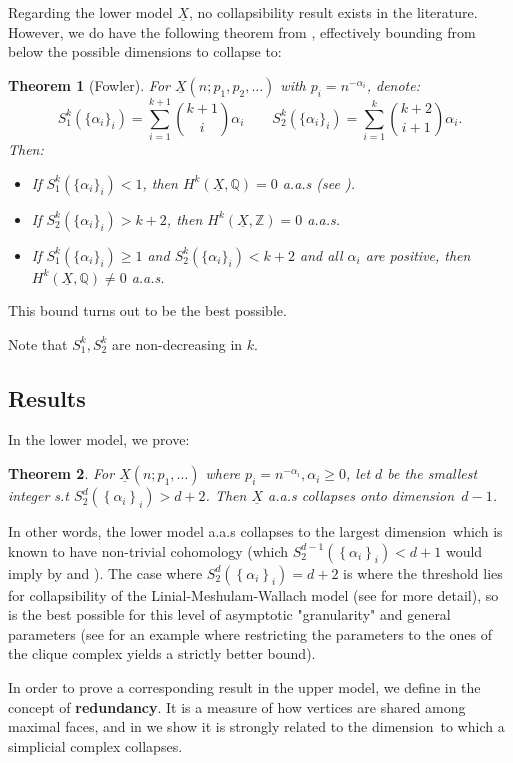\documentclass{article}
\newcommand{\crb}[1]{\left\{ #1 \right\}}
\theoremstyle{plain}
\newtheorem{theorem}{Theorem}[section]
\theoremstyle{definition}
\theoremstyle{remark}
\newcommand{\Z}{\mathbb{Z}}
\newcommand{\Q}{\mathbb{Q}}
\newcommand{\di}{dimension}
\begin{document}
Regarding the lower model $\underline{X}$, no collapsibility result exists in the literature. However, we do have the following theorem from \cite{Fowler19}, effectively bounding from below the possible \di s to collapse to:
\begin{theorem}[Fowler]\label{thmFowler}
    For $\underline{X}(n;p_1,p_2,...)$ with $p_i=n^{-\alpha_i}$, denote: $$S_1^k(\{\alpha_i\}_i)=\sum_{i=1}^{k+1}\binom{k+1}{i}\alpha_i\qquad S_2^k(\{\alpha_i\}_i)= \sum_{i=1}^{k}\binom{k+2}{i+1}\alpha_i.$$
        Then:
        \begin{itemize}
            \item If $S_1^k(\{\alpha_i\}_i)<1$, then $H^k(\underline{X},\Q)=0$ a.a.s (see ).
            \item If $S_2^k(\{\alpha_i\}_i)>k+2$, then $H^k(\underline{X},\Z)=0$ a.a.s.
            \item If $S_1^k(\{\alpha_i\}_i)\geq 1$ and $S_2^k(\{\alpha_i\}_i)<k+2$ and all $\alpha_i$ are positive, then $H^k(\underline{X},\Q)\neq 0$ a.a.s.
        \end{itemize}
\end{theorem} 
\noindent This bound turns out to be the best possible.

\noindent Note that $S_1^k,S_2^k$ are non-decreasing in $k$.


\subsection{Results} 
In the lower model, we prove:
\begin{theorem}\label{thm:lowerCollapse}
    For $\underline{X}(n;p_1,...)$ where $p_i=n^{-\alpha_i},\alpha_i\ge 0$, let $d$ be the smallest integer s.t $S_2 ^d(\crb{\alpha_i}_i)>d+2$. Then $\underline{X}$ a.a.s collapses onto \di\ $d-1$.
\end{theorem}
In other words, the lower model a.a.s collapses to the largest \di \ which is known to have non-trivial cohomology (which $S_2 ^{d-1}(\crb{\alpha_i}_i)<d+1$ would imply by  and ).
The case where $S_2 ^d(\crb{\alpha_i}_i)=d+2$ is where the threshold lies for collapsibility of the Linial-Meshulam-Wallach model (see  for more detail), so  is the best possible for this level of asymptotic "granularity" and general parameters (see  for an example where restricting the parameters to the ones of the clique complex yields a strictly better bound).

In order to prove a corresponding result in the upper model, we define in  the concept of \textbf{redundancy}. It is a measure of how vertices are shared among maximal faces, and in  we show it is strongly related to the \di\ to which a simplicial complex collapses.
\end{document}
